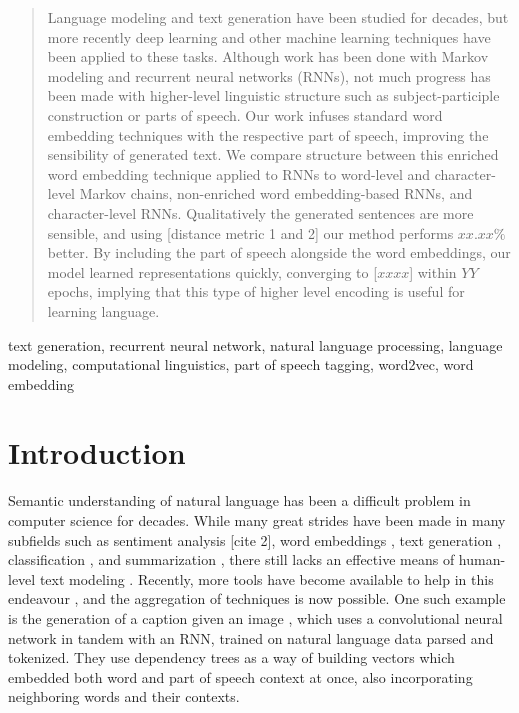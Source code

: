 \documentclass[conference]{IEEEtran}
\begin{document}
\begin{abstract}
Language modeling and text generation have been studied for decades, but more recently deep learning and other machine learning techniques have been applied to these tasks. Although work has been done with Markov modeling and recurrent neural networks (RNNs), not much progress has been made with higher-level linguistic structure such as subject-participle construction or parts of speech.  Our work infuses standard word embedding techniques with the respective part of speech, improving the sensibility of generated text.  We compare structure between this enriched word embedding technique applied to RNNs to word-level and character-level Markov chains, non-enriched word embedding-based RNNs, and character-level RNNs.  Qualitatively the generated sentences are more sensible, and using [distance metric 1 and 2] our method performs $xx.xx\%$ better.  By including the part of speech alongside the word embeddings, our model learned representations quickly, converging to [$xxxx$] within $YY$ epochs, implying that this type of higher level encoding is useful for learning language. 
\end{abstract}

\begin{IEEEkeywords}
text generation, recurrent neural network, natural language processing, language modeling, computational linguistics, part of speech tagging, word2vec, word embedding
\end{IEEEkeywords}

\section{Introduction}
Semantic understanding of natural language has been a difficult problem in computer science for decades. \cite{linell2004written} While many great strides have been made in many subfields such as sentiment analysis [cite 2], word embeddings \cite{DBLP:journals/corr/MikolovSCCD13}, text generation \cite{sutskever2011generating}, classification \cite{dumais2001methods}, and summarization \cite{Goldstein:1999:STD:312624.312665}, there still lacks an effective means of human-level text modeling \cite{WENYIN20104031}\cite{YAN201715}\cite{BICALHO201766}. Recently, more tools have become available to help in this endeavour \cite{DBLP:journals/corr/MikolovSCCD13}\cite{bird2004nltk}\cite{honnibal2015improved}, and the aggregation of techniques is now possible. One such example is the generation of a caption given an image \cite{johnson2016densecap}, which uses a convolutional neural network in tandem with an RNN, trained on natural language data parsed and tokenized.  They use dependency trees as a way of building vectors which embedded both word and part of speech context at once, also incorporating neighboring words and their contexts.
\end{document}
